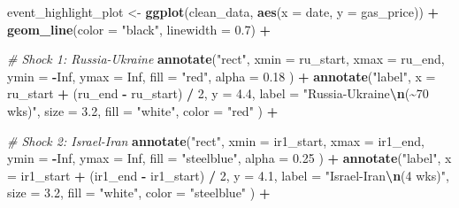 \documentclass[
]{article}
\newenvironment{Shaded}{\begin{snugshade}}{\end{snugshade}}
\newcommand{\AttributeTok}[1]{\textcolor[rgb]{0.13,0.29,0.53}{#1}}
\newcommand{\CommentTok}[1]{\textcolor[rgb]{0.56,0.35,0.01}{\textit{#1}}}
\newcommand{\ConstantTok}[1]{\textcolor[rgb]{0.56,0.35,0.01}{#1}}
\newcommand{\DecValTok}[1]{\textcolor[rgb]{0.00,0.00,0.81}{#1}}
\newcommand{\FloatTok}[1]{\textcolor[rgb]{0.00,0.00,0.81}{#1}}
\newcommand{\FunctionTok}[1]{\textcolor[rgb]{0.13,0.29,0.53}{\textbf{#1}}}
\newcommand{\NormalTok}[1]{#1}
\newcommand{\OtherTok}[1]{\textcolor[rgb]{0.56,0.35,0.01}{#1}}
\newcommand{\SpecialCharTok}[1]{\textcolor[rgb]{0.81,0.36,0.00}{\textbf{#1}}}
\newcommand{\StringTok}[1]{\textcolor[rgb]{0.31,0.60,0.02}{#1}}
\begin{document}
\begin{Shaded}
\begin{Highlighting}[]
\NormalTok{event\_highlight\_plot }\OtherTok{\textless{}{-}} \FunctionTok{ggplot}\NormalTok{(clean\_data, }\FunctionTok{aes}\NormalTok{(}\AttributeTok{x =}\NormalTok{ date, }\AttributeTok{y =}\NormalTok{ gas\_price)) }\SpecialCharTok{+}
  \FunctionTok{geom\_line}\NormalTok{(}\AttributeTok{color =} \StringTok{"black"}\NormalTok{, }\AttributeTok{linewidth =} \FloatTok{0.7}\NormalTok{) }\SpecialCharTok{+}

  \CommentTok{\# Shock 1: Russia{-}Ukraine}
  \FunctionTok{annotate}\NormalTok{(}\StringTok{"rect"}\NormalTok{,}
    \AttributeTok{xmin =}\NormalTok{ ru\_start, }\AttributeTok{xmax =}\NormalTok{ ru\_end,}
    \AttributeTok{ymin =} \SpecialCharTok{{-}}\ConstantTok{Inf}\NormalTok{, }\AttributeTok{ymax =} \ConstantTok{Inf}\NormalTok{, }\AttributeTok{fill =} \StringTok{"red"}\NormalTok{, }\AttributeTok{alpha =} \FloatTok{0.18}
\NormalTok{  ) }\SpecialCharTok{+}
  \FunctionTok{annotate}\NormalTok{(}\StringTok{"label"}\NormalTok{,}
    \AttributeTok{x =}\NormalTok{ ru\_start }\SpecialCharTok{+}\NormalTok{ (ru\_end }\SpecialCharTok{{-}}\NormalTok{ ru\_start) }\SpecialCharTok{/} \DecValTok{2}\NormalTok{, }\AttributeTok{y =} \FloatTok{4.4}\NormalTok{,}
    \AttributeTok{label =} \StringTok{"Russia{-}Ukraine}\SpecialCharTok{\textbackslash{}n}\StringTok{(\textasciitilde{}70 wks)"}\NormalTok{, }\AttributeTok{size =} \FloatTok{3.2}\NormalTok{, }\AttributeTok{fill =} \StringTok{"white"}\NormalTok{, }\AttributeTok{color =} \StringTok{"red"}
\NormalTok{  ) }\SpecialCharTok{+}

  \CommentTok{\# Shock 2: Israel{-}Iran}
  \FunctionTok{annotate}\NormalTok{(}\StringTok{"rect"}\NormalTok{,}
    \AttributeTok{xmin =}\NormalTok{ ir1\_start, }\AttributeTok{xmax =}\NormalTok{ ir1\_end,}
    \AttributeTok{ymin =} \SpecialCharTok{{-}}\ConstantTok{Inf}\NormalTok{, }\AttributeTok{ymax =} \ConstantTok{Inf}\NormalTok{, }\AttributeTok{fill =} \StringTok{"steelblue"}\NormalTok{, }\AttributeTok{alpha =} \FloatTok{0.25}
\NormalTok{  ) }\SpecialCharTok{+}
  \FunctionTok{annotate}\NormalTok{(}\StringTok{"label"}\NormalTok{,}
    \AttributeTok{x =}\NormalTok{ ir1\_start }\SpecialCharTok{+}\NormalTok{ (ir1\_end }\SpecialCharTok{{-}}\NormalTok{ ir1\_start) }\SpecialCharTok{/} \DecValTok{2}\NormalTok{, }\AttributeTok{y =} \FloatTok{4.1}\NormalTok{,}
    \AttributeTok{label =} \StringTok{"Israel{-}Iran}\SpecialCharTok{\textbackslash{}n}\StringTok{(4 wks)"}\NormalTok{, }\AttributeTok{size =} \FloatTok{3.2}\NormalTok{, }\AttributeTok{fill =} \StringTok{"white"}\NormalTok{, }\AttributeTok{color =} \StringTok{"steelblue"}
\NormalTok{  ) }\SpecialCharTok{+}


\end{Highlighting}
\end{Shaded}
\end{document}

